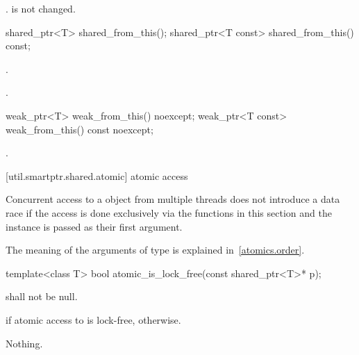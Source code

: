 \begin{itemdescr}
\pnum\returns  {}.
\pnum\enternote {} is not changed. \exitnote
\end{itemdescr}

%
%
%
\begin{itemdecl}
shared_ptr<T>       shared_from_this();
shared_ptr<T const> shared_from_this() const;
\end{itemdecl}

\begin{itemdescr}
\pnum\returns  {}.

\pnum\postcondition  {}.
\end{itemdescr}

%
%
%
\begin{itemdecl}
weak_ptr<T>       weak_from_this() noexcept;
weak_ptr<T const> weak_from_this() const noexcept;
\end{itemdecl}

\begin{itemdescr}
\pnum\returns  {}.
\end{itemdescr}

[util.smartptr.shared.atomic]{ atomic access}

\pnum
Concurrent access to a  object from multiple threads does not
introduce a data race if the access is done exclusively via the functions in
this section and the instance is passed as their first argument.

\pnum
The meaning of the arguments of type  is explained in~\ref{atomics.order}.

%
%
\begin{itemdecl}
template<class T>
  bool atomic_is_lock_free(const shared_ptr<T>* p);
\end{itemdecl}

\begin{itemdescr}
\pnum
\requires {} shall not be null.

\pnum
\returns {} if atomic access to  is lock-free,  otherwise.

\pnum
\throws Nothing.
\end{itemdescr}

